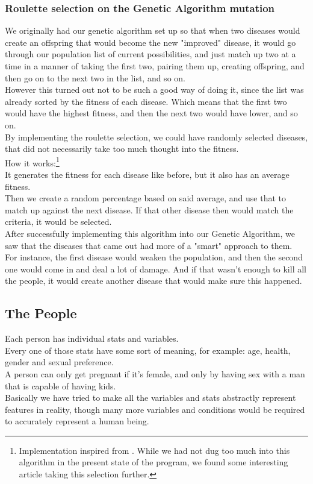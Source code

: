 \documentclass[conference,compsoc]{IEEEtran}
\begin{document}
\subsubsection{Roulette selection on the Genetic Algorithm mutation} 
We originally had our genetic algorithm set up so that when two diseases would create an offspring that would become the new "improved" disease, it would go through our population list of current possibilities, and just match up two at a time in a manner of taking the first two, pairing them up, creating offspring, and then go on to the next two in the list, and so on.\\
However this turned out not to be such a good way of doing it, since the list was already sorted by the fitness of each disease. Which means that the first two would have the highest fitness, and then the next two would have lower, and so on.\\
By implementing the roulette selection, we could have randomly selected diseases, that did not necessarily take too much thought into the fitness.\\

How it works:\footnote{Implementation inspired from \cite{rsImplementation}. While we had not dug too much into this algorithm in the present state of the program, we found some interesting article \cite{slowik2004modified} taking this selection further.}\\
It generates the fitness for each disease like before, but it also has an average fitness.\\
Then we create a random percentage based on said average, and use that to match up against the next disease. If that other disease then would match the criteria, it would be selected.\\
After successfully implementing this algorithm into our Genetic Algorithm, we saw that the diseases that came out had more of a "smart" approach to them.\\
For instance, the first disease would weaken the population, and then the second one would come in and deal a lot of damage. And if that wasn't enough to kill all the people, it would create another disease that would make sure this happened.\\

\subsection{The People}
Each person has individual stats and variables.\\
Every one of those stats have some sort of meaning, for example: age, health, gender and sexual preference.\\
A person can only get pregnant if it's female, and only by having sex with a man that is capable of having kids.\\
Basically we have tried to make all the variables and stats abstractly represent features in reality, though many more variables and conditions would be required to accurately represent a human being.\\
\end{document}
